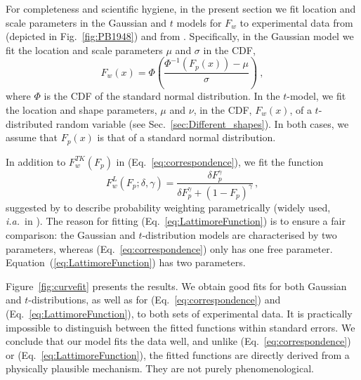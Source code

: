 \documentclass[12pt,letter,timesnewroman]{article}
\newcommand{\elabel}[1]{\label{eq:#1}}
\newcommand{\eref}[1]{(Eq.~\ref{eq:#1})}
\newcommand{\Eref}[1]{Equation~(\ref{eq:#1})}
\newcommand{\fref}[1]{Fig.~\ref{fig:#1}}
\newcommand{\Fref}[1]{Figure~\ref{fig:#1}}
\newcommand{\secref}[1]{Sec.~\ref{sec:#1}}
\newcommand{\ia}{\textit{i.a.}\ }
\newcommand{\be}{\begin{equation}}
\newcommand{\ee}{\end{equation}}
\begin{document}
For completeness and scientific hygiene, in the present section we fit location and scale parameters in the Gaussian and $t$ models for $F_w$ to experimental data from \textcite{PrestonBaratta1948} (depicted in \fref{PB1948}) and from \textcite{TverskyFox1995}. Specifically, in the Gaussian model we fit the location and scale parameters $\mu$ and $\sigma$ in the CDF,
%
\be
F_w\left(x\right) = \Phi\left(\frac{\Phi^{-1}\left(F_p\left(x\right)\right) - \mu}{\sigma}\right)~,
\ee
%
where $\Phi$ is the CDF of the standard normal distribution. In the $t$-model, we fit the location and shape parameters, $\mu$ and $\nu$, in the CDF, $F_w(x)$, of a $t$-distributed random variable (see \secref{Different_shapes}). In both cases, we assume that $F_p(x)$ is that of a standard normal distribution.

In addition to $F^{TK}_w(F_p)$ in \eref{correspondence}, we fit the function
%
\be
F^{L}_w\left(F_p; \delta,\gamma\right) =\frac{\delta F_p^{\gamma}}{\delta F_p^{\gamma} + \left(1-F_p\right)^{\gamma}}\,,
\elabel{LattimoreFunction}
\ee
%
suggested by \textcite{LattimoreBakerWitte1992} to describe probability weighting parametrically (widely used, \ia in \textcite{TverskyWakker1995,Prelec1998}). The reason for fitting \eref{LattimoreFunction} is to ensure a fair comparison: the Gaussian and $t$-distribution models are characterised by two parameters, whereas \eref{correspondence} only has one free parameter. \Eref{LattimoreFunction} has two parameters.

\Fref{curvefit} presents the results. We obtain good fits for both Gaussian and $t$-distributions, as well as for \eref{correspondence} and \eref{LattimoreFunction}, to both sets of experimental data. It is practically impossible to distinguish between the fitted functions within standard errors. We conclude that our model fits the data well, and unlike \eref{correspondence} or \eref{LattimoreFunction}, the fitted functions are directly derived from a physically plausible mechanism. They are not purely phenomenological.
\end{document}
